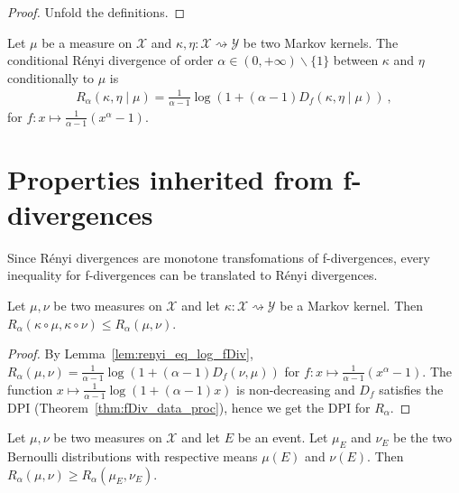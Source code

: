 \begin{proof}
Unfold the definitions.
\end{proof}

\begin{definition}
  \label{def:condRenyi}
  Let $\mu$ be a measure on $\mathcal X$ and $\kappa, \eta : \mathcal X \rightsquigarrow \mathcal Y$ be two Markov kernels. The conditional Rényi divergence of order $\alpha \in (0,+\infty) \backslash \{1\}$ between $\kappa$ and $\eta$ conditionally to $\mu$ is
  \begin{align*}
  R_\alpha(\kappa, \eta \mid \mu) =\frac{1}{\alpha - 1} \log (1 + (\alpha - 1) D_f(\kappa, \eta \mid \mu)) \: ,
  \end{align*}
  for $f : x \mapsto \frac{1}{\alpha - 1}(x^{\alpha} - 1)$.
\end{definition}

\section{Properties inherited from f-divergences}

Since Rényi divergences are monotone transfomations of f-divergences, every inequality for f-divergences can be translated to Rényi divergences.

\begin{theorem}
  \label{thm:renyi_data_proc}
  Let $\mu, \nu$ be two measures on $\mathcal X$ and let $\kappa : \mathcal X \rightsquigarrow \mathcal Y$ be a Markov kernel.
  Then $R_\alpha(\kappa \circ \mu, \kappa \circ \nu) \le R_\alpha(\mu, \nu)$.
\end{theorem}

\begin{proof}
By Lemma~\ref{lem:renyi_eq_log_fDiv}, $R_\alpha(\mu, \nu) = \frac{1}{\alpha - 1} \log (1 + (\alpha - 1) D_f(\nu, \mu))$ for $f : x \mapsto \frac{1}{\alpha - 1}(x^{\alpha} - 1)$.
The function $x \mapsto \frac{1}{\alpha - 1}\log (1 + (\alpha - 1)x)$ is non-decreasing and $D_f$ satisfies the DPI (Theorem~\ref{thm:fDiv_data_proc}), hence we get the DPI for $R_\alpha$.
\end{proof}

\begin{lemma}
  \label{lem:renyi_data_proc_event}
  Let $\mu, \nu$ be two measures on $\mathcal X$ and let $E$ be an event. Let $\mu_E$ and $\nu_E$ be the two Bernoulli distributions with respective means $\mu(E)$ and $\nu(E)$.
  Then $R_\alpha(\mu, \nu) \ge R_\alpha(\mu_E, \nu_E)$.
\end{lemma}

